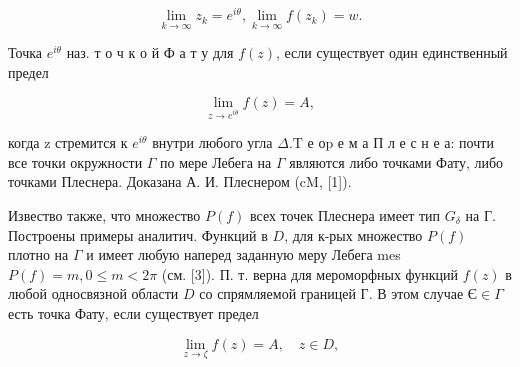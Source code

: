 \documentclass[10pt]{article}
\begin{document}
\[

\lim _{k \rightarrow \infty} z_{k}=e^{i \theta}, \lim _{k \rightarrow \infty} f\left(z_{k}\right)=w .

\]



Точка $e^{i \theta}$ наз. т о ч к о й $Ф$ а т у для $f(z)$, если существует один единственный предел



\[

\lim _{z \rightarrow e^{i \theta}} f(z)=A,

\]



когда z стремится к $e^{i \theta}$ внутри любого угла $\Delta . \mathrm{T}$ е оp е м а П л е с н е а: почти все точки окружности $\Gamma$ по мере Лебега на $\Gamma$ являются либо точками Фату, либо точками Плеснера. Доказана А. И. Плеснером (cM, [1]).



Извество также, что множество $P(f)$ всех точек Плеснера имеет тип $G_{\delta}$ на $Г$. Построены примеры аналитич. Функций в $D$, для к-рых множество $P(f)$ плотно на $\Gamma$ и имеет любую наперед заданную меру Лебега mes $P(f)=m, 0 \leqslant m<2 \pi$ (см. [3]). П. т. верна для мероморфных функций $f(z)$ в любой односвязной области $D$ со спрямляемой границей Г. В этом случае $Є \in \Gamma$ есть точка Фату, если существует предел



\[

\lim _{z \rightarrow \zeta} f(z)=A, \quad z \in D,

\]
\end{document}
